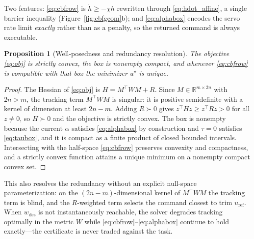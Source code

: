 \documentclass[letter, 10 pt, journal, twoside]{IEEEtran}
\theoremstyle{compact}
\newtheorem{proposition}[theorem]{Proposition}
\begin{document}
Two features: \eqref{eq:cbfrow} is $\dot h\ge-\chi h$ rewritten through \eqref{eq:hdot_affine}, a single barrier inequality (Figure~\ref{fig:cbfgeom}b); and \eqref{eq:alphabox} encodes the servo rate limit \emph{exactly} rather than as a penalty, so the returned command is always executable.%
 
\begin{proposition}[Well-posedness and redundancy resolution]\label{prop:well}
The objective \eqref{eq:obj} is strictly convex, the box is nonempty compact, and whenever \eqref{eq:cbfrow} is compatible with that box the minimizer $u^\star$ is unique.
\end{proposition}
 
\begin{proof}
The Hessian of \eqref{eq:obj} is $H=M^{\!\top}WM+R$. Since $M\in\mathbb{R}^{m\times 2n}$ with $2n>m$, the tracking term $M^{\!\top}WM$ is singular: it is positive semidefinite with a kernel of dimension at least $2n-m$. Adding $R\succ0$ gives $z^{\!\top}Hz\ge z^{\!\top}Rz>0$ for all $z\neq0$, so $H\succ0$ and the objective is strictly convex. The box is nonempty because the current $\alpha$ satisfies \eqref{eq:alphabox} by construction and $\tau=0$ satisfies \eqref{eq:taubox}, and it is compact as a finite product of closed bounded intervals. Intersecting with the half-space \eqref{eq:cbfrow} preserves convexity and compactness, and a strictly convex function attains a unique minimum on a nonempty compact convex set.%
\end{proof}
 
This also resolves the redundancy without an explicit null-space parameterization: on the $(2n-m)$-dimensional kernel of $M^{\!\top}WM$ the tracking term is blind, and the $R$-weighted term selects the command closest to trim $u_{\mathrm{ref}}$. When $w_{\mathrm{des}}$ is not instantaneously reachable, the solver degrades tracking optimally in the metric $W$ while \eqref{eq:cbfrow}--\eqref{eq:alphabox} continue to hold exactly---the certificate is never traded against the task.


\end{document}
